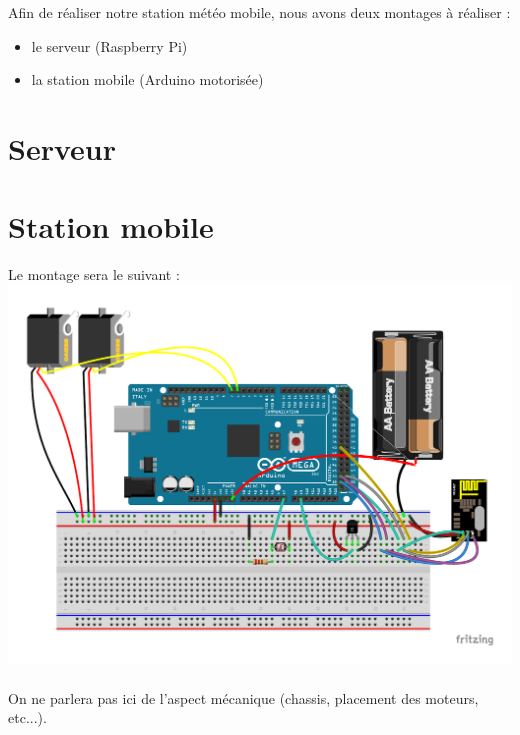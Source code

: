 Afin de réaliser notre station météo mobile, nous avons deux montages à
réaliser :
\begin{itemize}
\item le serveur (Raspberry Pi)
\item la station mobile (Arduino motorisée)
\end{itemize}

\section{Serveur}

\section{Station mobile}
Le montage sera le suivant :
\includegraphics[scale=0.5]{include/arduino_bb.pdf}
\paragraph{}
On ne parlera pas ici de l'aspect mécanique (chassis, placement des moteurs,
etc...).
